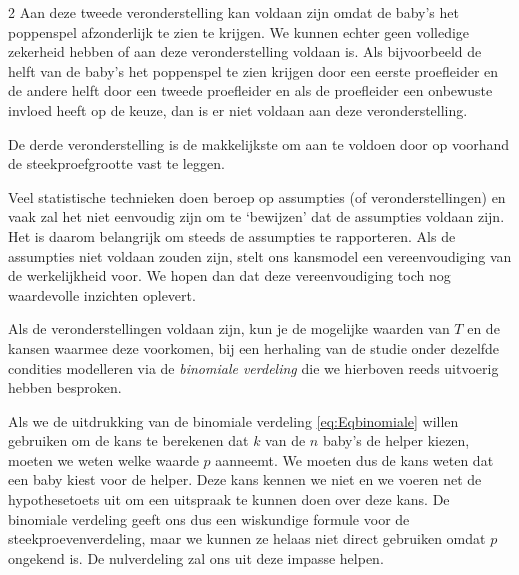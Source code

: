 \begin{multicols}{2}
Aan deze tweede veronderstelling kan voldaan zijn omdat de baby's het poppenspel afzonderlijk te zien te krijgen. We kunnen echter geen volledige zekerheid hebben of aan deze veronderstelling voldaan is. Als bijvoorbeeld de helft van de baby's het poppenspel te zien krijgen door een eerste proefleider en de andere helft door een tweede proefleider en als de proefleider een onbewuste invloed heeft op de keuze, dan is er niet voldaan aan deze veronderstelling. 

De derde veronderstelling is de makkelijkste om aan te voldoen door op voorhand de steekproefgrootte vast te leggen. 

Veel statistische technieken doen beroep op assumpties (of veronderstellingen) en vaak zal het niet eenvoudig zijn om te `bewijzen' dat de assumpties voldaan zijn. Het is daarom belangrijk om steeds de assumpties te rapporteren. Als de assumpties niet voldaan zouden zijn, stelt ons kansmodel een vereenvoudiging van de werkelijkheid voor. We hopen dan dat deze vereenvoudiging toch nog waardevolle inzichten oplevert.


Als de veronderstellingen voldaan zijn, kun je de mogelijke waarden van \(T\) en de kansen waarmee deze voorkomen, bij een herhaling van de studie onder dezelfde condities modelleren via de \emph{binomiale verdeling} die we hierboven reeds uitvoerig hebben besproken.


Als we de uitdrukking van de binomiale verdeling \eqref{eq:Eqbinomiale} willen gebruiken om de kans te berekenen dat $k$ van de $n$ baby's de helper kiezen, moeten we weten welke waarde \(p \) aanneemt. We moeten dus de kans weten dat een baby kiest voor de helper. Deze kans kennen we niet en we voeren net de hypothesetoets uit om een uitspraak te kunnen doen over deze kans. De binomiale verdeling geeft ons dus een wiskundige formule voor de steekproevenverdeling, maar we kunnen ze helaas niet direct gebruiken omdat \(p\) ongekend is. De nulverdeling zal ons uit deze impasse helpen.


\end{multicols}
